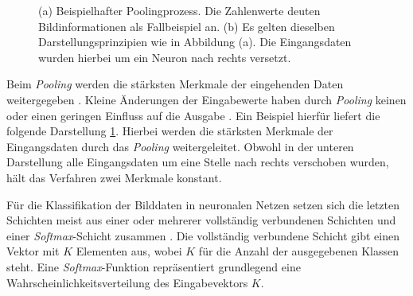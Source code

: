 \begin{figure}[H]
			\caption{(a) Beispielhafter Poolingprozess. Die Zahlenwerte deuten Bildinformationen als Fallbeispiel an. (b) Es gelten dieselben Darstellungsprinzipien wie in Abbildung (a). Die Eingangsdaten wurden hierbei um ein Neuron nach rechts versetzt. \cite{deeplearning}}
			\label{fig: Pooling}
		\end{figure}
	
		Beim \textit{Pooling} werden die stärksten Merkmale der eingehenden Daten weitergegeben \cite{deeplearning}. Kleine Änderungen der Eingabewerte haben durch \textit{Pooling} keinen oder einen geringen Einfluss auf die Ausgabe \cite{deeplearning}. Ein Beispiel hierfür liefert die folgende Darstellung \ref{fig: Pooling}. Hierbei werden die stärksten Merkmale der Eingangsdaten durch das \textit{Pooling} weitergeleitet. Obwohl in der unteren Darstellung alle Eingangsdaten um eine Stelle nach rechts verschoben wurden, hält das Verfahren zwei Merkmale konstant.\newpage
		
		Für die Klassifikation der Bilddaten in neuronalen Netzen setzen sich die letzten Schichten meist aus einer oder mehrerer vollständig verbundenen Schichten und einer \textit{Softmax}-Schicht zusammen \cite{deeplearning}. Die vollständig verbundene Schicht gibt einen Vektor mit $K$ Elementen aus, wobei $K$ für die Anzahl der ausgegebenen Klassen steht. Eine \textit{Softmax}-Funktion repräsentiert grundlegend eine Wahrscheinlichkeitsverteilung des Eingabevektors $K$.\\ 
		
